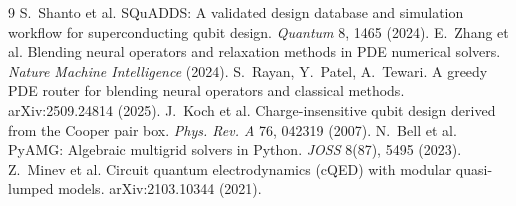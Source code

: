 \documentclass[11pt]{article}
\begin{document}

\begin{thebibliography}{9}
 S.~Shanto et al. SQuADDS: A validated design database and
simulation workflow for superconducting qubit design. \emph{Quantum} 8, 1465
(2024).
 E.~Zhang et al. Blending neural operators and relaxation
methods in PDE numerical solvers. \emph{Nature Machine Intelligence} (2024).
 S.~Rayan, Y.~Patel, A.~Tewari. A greedy PDE router for
blending neural operators and classical methods. arXiv:2509.24814 (2025).
 J.~Koch et al. Charge-insensitive qubit design derived from the
Cooper pair box. \emph{Phys. Rev. A} 76, 042319 (2007).
 N.~Bell et al. PyAMG: Algebraic multigrid solvers in Python.
\emph{JOSS} 8(87), 5495 (2023).
 Z.~Minev et al. Circuit quantum electrodynamics (cQED) with
modular quasi-lumped models. arXiv:2103.10344 (2021).
\end{thebibliography}
\end{document}
